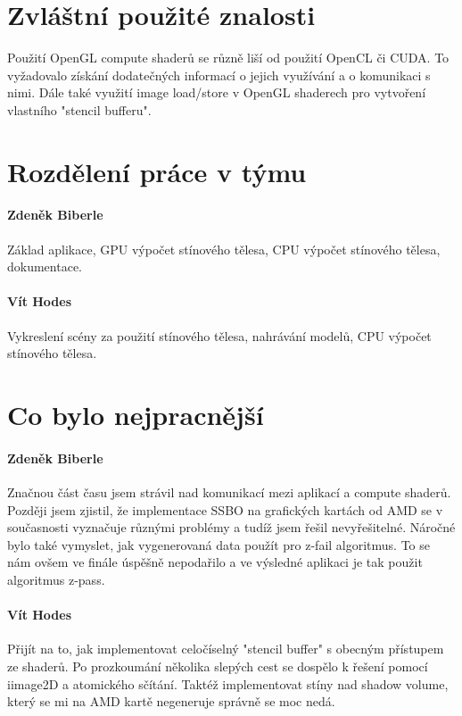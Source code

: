 \documentclass[11pt,a4paper]{article}
\begin{document}
\section{Zvláštní použité znalosti}

Použití OpenGL compute shaderů se různě liší od použití OpenCL či CUDA. To vyžadovalo získání dodatečných informací o jejich využívání a o komunikaci s nimi. Dále také využití image load/store v OpenGL shaderech pro vytvoření vlastního "stencil bufferu".

\section{Rozdělení práce v týmu}

\paragraph{Zdeněk Biberle} Základ aplikace, GPU výpočet stínového tělesa, CPU výpočet stínového tělesa, dokumentace.
\paragraph{Vít Hodes} Vykreslení scény za použití stínového tělesa, nahrávání modelů, CPU výpočet stínového tělesa.

\section{Co bylo nejpracnější}

\paragraph{Zdeněk Biberle}
Značnou část času jsem strávil nad komunikací mezi aplikací a compute shaderů. Později jsem zjistil, že implementace SSBO na grafických kartách od AMD se v současnosti vyznačuje různými problémy a tudíž jsem řešil nevyřešitelné. Náročné bylo také vymyslet, jak vygenerovaná data použít pro z-fail algoritmus. To se nám ovšem ve finále úspěšně nepodařilo a ve výsledné aplikaci je tak použit algoritmus z-pass.

\paragraph{Vít Hodes} Přijít na to, jak implementovat celočíselný "stencil buffer" s obecným přístupem ze shaderů. Po prozkoumání několika slepých cest se dospělo k řešení pomocí iimage2D a atomického sčítání. Taktéž implementovat stíny nad shadow volume, který se mi na AMD kartě negeneruje správně se moc nedá.
\end{document}
